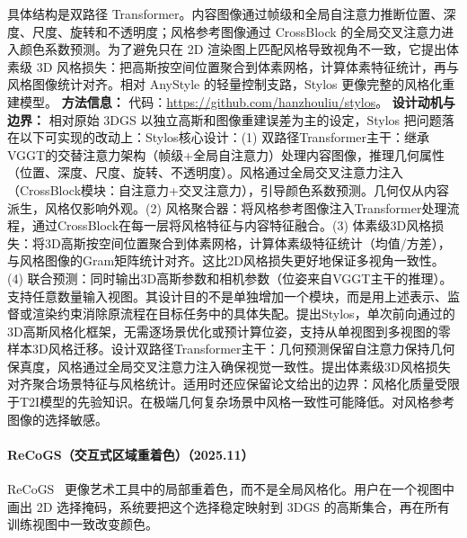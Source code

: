 具体结构是双路径 Transformer。内容图像通过帧级和全局自注意力推断位置、深度、尺度、旋转和不透明度；风格参考图像通过 CrossBlock 的全局交叉注意力进入颜色系数预测。为了避免只在 2D 渲染图上匹配风格导致视角不一致，它提出体素级 3D 风格损失：把高斯按空间位置聚合到体素网格，计算体素特征统计，再与风格图像统计对齐。相对 AnyStyle 的轻量控制支路，Stylos 更像完整的风格化重建模型。
\textbf{方法信息：} 代码：\url{https://github.com/hanzhouliu/stylos}。
\textbf{设计动机与边界：} 相对原始 3DGS 以独立高斯和图像重建误差为主的设定，Stylos 把问题落在以下可实现的改动上：Stylos核心设计：(1) 双路径Transformer主干：继承VGGT的交替注意力架构（帧级+全局自注意力）处理内容图像，推理几何属性（位置、深度、尺度、旋转、不透明度）。风格通过全局交叉注意力注入（CrossBlock模块：自注意力+交叉注意力），引导颜色系数预测。几何仅从内容派生，风格仅影响外观。(2) 风格聚合器：将风格参考图像注入Transformer处理流程，通过CrossBlock在每一层将风格特征与内容特征融合。(3) 体素级3D风格损失：将3D高斯按空间位置聚合到体素网格，计算体素级特征统计（均值/方差），与风格图像的Gram矩阵统计对齐。这比2D风格损失更好地保证多视角一致性。(4) 联合预测：同时输出3D高斯参数和相机参数（位姿来自VGGT主干的推理）。支持任意数量输入视图。其设计目的不是单独增加一个模块，而是用上述表示、监督或渲染约束消除原流程在目标任务中的具体失配。提出Stylos，单次前向通过的3D高斯风格化框架，无需逐场景优化或预计算位姿，支持从单视图到多视图的零样本3D风格迁移。设计双路径Transformer主干：几何预测保留自注意力保持几何保真度，风格通过全局交叉注意力注入确保视觉一致性。提出体素级3D风格损失对齐聚合场景特征与风格统计。适用时还应保留论文给出的边界：风格化质量受限于T2I模型的先验知识。在极端几何复杂场景中风格一致性可能降低。对风格参考图像的选择敏感。
\paragraph{ReCoGS（交互式区域重着色）（2025.11）}
ReCoGS~\cite{2511_18441} 更像艺术工具中的局部重着色，而不是全局风格化。用户在一个视图中画出 2D 选择掩码，系统要把这个选择稳定映射到 3DGS 的高斯集合，再在所有训练视图中一致改变颜色。


